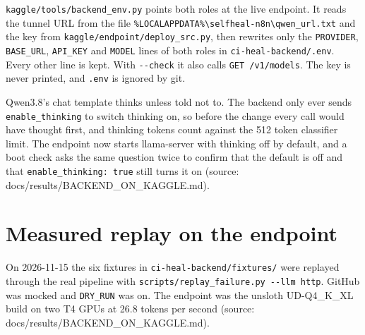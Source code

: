 \texttt{kaggle/\allowbreak{}tools/\allowbreak{}backend\_\allowbreak{}env.\allowbreak{}py} points both roles at the live endpoint. It reads the tunnel URL from the file \texttt{\%LOCALAPPDATA\%\textbackslash{}selfheal-\allowbreak{}n8n\textbackslash{}qwen\_\allowbreak{}url.\allowbreak{}txt} and the key from \texttt{kaggle/\allowbreak{}endpoint/\allowbreak{}deploy\_\allowbreak{}src.\allowbreak{}py}, then rewrites only the \texttt{PROVIDER}, \texttt{BASE\_\allowbreak{}URL}, \texttt{API\_\allowbreak{}KEY} and \texttt{MODEL} lines of both roles in \texttt{ci-\allowbreak{}heal-\allowbreak{}backend/\allowbreak{}.\allowbreak{}env}. Every other line is kept. With \texttt{-\allowbreak{}-\allowbreak{}check} it also calls \texttt{GET /\allowbreak{}v1/\allowbreak{}models}. The key is never printed, and \texttt{.\allowbreak{}env} is ignored by git.

Qwen3.8's chat template thinks unless told not to. The backend only ever sends \texttt{enable\_\allowbreak{}thinking} to switch thinking on, so before the change every call would have thought first, and thinking tokens count against the 512 token classifier limit. The endpoint now starts llama-server with thinking off by default, and a boot check asks the same question twice to confirm that the default is off and that \texttt{enable\_\allowbreak{}thinking:\allowbreak{} true} still turns it on (source: docs/\allowbreak{}results/\allowbreak{}BACKEND\_\allowbreak{}ON\_\allowbreak{}KAGGLE.md).

\section{Measured replay on the endpoint}

On 2026-11-15 the six fixtures in \texttt{ci-\allowbreak{}heal-\allowbreak{}backend/\allowbreak{}fixtures/\allowbreak{}} were replayed through the real pipeline with \texttt{scripts/\allowbreak{}replay\_\allowbreak{}failure.\allowbreak{}py -\allowbreak{}-\allowbreak{}llm http}. GitHub was mocked and \texttt{DRY\_\allowbreak{}RUN} was on. The endpoint was the unsloth UD-Q4\_\allowbreak{}K\_\allowbreak{}XL build on two T4 GPUs at 26.8 tokens per second (source: docs/\allowbreak{}results/\allowbreak{}BACKEND\_\allowbreak{}ON\_\allowbreak{}KAGGLE.md).

